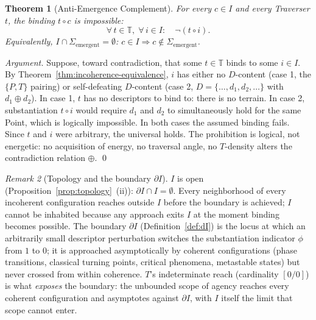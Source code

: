 \documentclass[11pt,a4paper]{article}
\newtheorem{theorem}{Theorem}[section]
\theoremstyle{definition}
\theoremstyle{remark}
\newtheorem{remark}[theorem]{Remark}
\begin{document}
\begin{theorem}[Anti-Emergence Complement]\label{thm:antiemergence-complement}
For every $c \in I$ and every Traverser $t$, the binding $t \circ c$ is impossible:
\[
\forall\, t \in \mathbb{T},\;\forall\, i \in I :\quad \neg(t \circ i).
\]
Equivalently, $I \cap \Sigma_{\mathrm{emergent}} = \emptyset$: $c \in I \Rightarrow c \notin \Sigma_{\mathrm{emergent}}$.
\end{theorem}

\begin{proof}[Argument]
Suppose, toward contradiction, that some $t \in \mathbb{T}$ binds to some $i \in I$. By Theorem~\ref{thm:incoherence-equivalence}, $i$ has either no $D$-content (case 1, the $\{P,T\}$ pairing) or self-defeating $D$-content (case 2, $D = \{\ldots, d_{1}, d_{2}, \ldots\}$ with $d_{1} \oplus d_{2}$). In case 1, $t$ has no descriptors to bind to: there is no terrain. In case 2, substantiation $t \circ i$ would require $d_{1}$ and $d_{2}$ to simultaneously hold for the same Point, which is logically impossible. In both cases the assumed binding fails. Since $t$ and $i$ were arbitrary, the universal holds. The prohibition is logical, not energetic: no acquisition of energy, no traversal angle, no $T$-density alters the contradiction relation $\oplus$. \qed
\end{proof}

\begin{remark}[Topology and the boundary $\partial I$]\label{rem:I-topology}
$I$ is open (Proposition~\ref{prop:topology}~(ii)): $\partial I \cap I = \emptyset$. Every neighborhood of every incoherent configuration reaches outside $I$ before the boundary is achieved; $I$ cannot be inhabited because any approach exits $I$ at the moment binding becomes possible. The boundary $\partial I$ (Definition~\ref{def:dI}) is the locus at which an arbitrarily small descriptor perturbation switches the substantiation indicator $\phi$ from $1$ to $0$; it is approached asymptotically by coherent configurations (phase transitions, classical turning points, critical phenomena, metastable states) but never crossed from within coherence. $T$'s indeterminate reach (cardinality $[0/0]$) is what \emph{exposes} the boundary: the unbounded scope of agency reaches every coherent configuration and asymptotes against $\partial I$, with $I$ itself the limit that scope cannot enter.
\end{remark}
\end{document}
